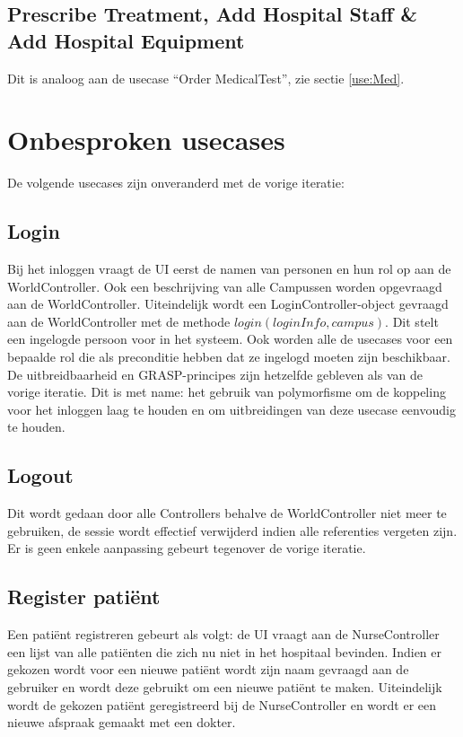 \subsection{Prescribe Treatment, Add Hospital Staff \& Add Hospital Equipment}
Dit is analoog aan de usecase ``Order MedicalTest'', zie sectie \ref{use:Med}. 


\section{Onbesproken usecases\label{rest}}
De volgende usecases zijn onveranderd met de vorige iteratie:
\subsection{Login}
Bij het inloggen vraagt de UI eerst de namen van personen en hun rol op aan de WorldController. 
Ook een beschrijving van alle Campussen worden opgevraagd aan de WorldController. 
Uiteindelijk wordt een LoginController-object gevraagd aan de WorldController met de methode $login(loginInfo, campus)$. 
Dit stelt een ingelogde persoon voor in het systeem. 
Ook worden alle de usecases voor een bepaalde rol die als preconditie hebben dat ze ingelogd moeten zijn beschikbaar.
De uitbreidbaarheid en GRASP-principes zijn hetzelfde gebleven als van de vorige iteratie. 
Dit is met name: het gebruik van polymorfisme om de koppeling voor het inloggen laag te houden en om uitbreidingen van deze usecase eenvoudig te houden.

\subsection{Logout}
Dit wordt gedaan door alle Controllers behalve de WorldController niet meer te gebruiken, de sessie wordt effectief verwijderd indien alle referenties vergeten zijn.
Er is geen enkele aanpassing gebeurt tegenover de vorige iteratie.

\subsection{Register patiënt}
Een patiënt registreren gebeurt als volgt: de UI vraagt aan de NurseController een lijst van alle patiënten die zich nu niet in het hospitaal bevinden.
Indien er gekozen wordt voor een nieuwe patiënt wordt zijn naam gevraagd aan de gebruiker en wordt deze gebruikt om een nieuwe patiënt te maken. 
Uiteindelijk wordt de gekozen patiënt geregistreerd bij de NurseController en wordt er een nieuwe afspraak gemaakt met een dokter.

